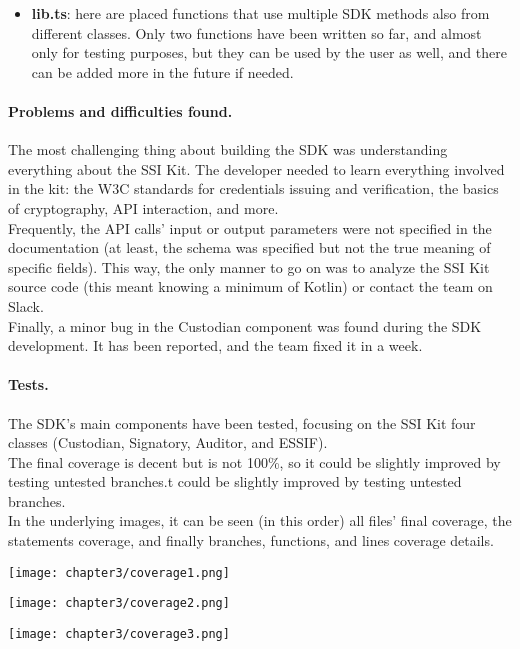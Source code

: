 \begin{itemize}
    \item \textbf{lib.ts}: here are placed functions that use multiple SDK methods also from
    different classes. Only two functions have been written so far, and almost only for
    testing purposes, but they can be used by the user as well, and there can be added more 
    in the future if needed.
    
\end{itemize}

\paragraph{Problems and difficulties found.}
The most challenging thing about building the SDK was understanding everything about 
the SSI Kit. The developer needed to learn everything involved in the kit: the W3C 
standards for credentials issuing and verification, the basics of cryptography,  
API interaction, and more.\\
Frequently, the API calls' input or output parameters were not specified in the 
documentation (at least, the schema was specified but not the true meaning of specific
fields). This way, the only manner to go on was to analyze the SSI Kit source code
 (this meant knowing a minimum of Kotlin) or contact the team on Slack.\\
Finally, a minor bug in the Custodian component was found during the SDK development.
It has been reported, and the team fixed it in a week.

\paragraph{Tests.}
The SDK's main components have been tested, focusing on the SSI Kit four classes 
(Custodian, Signatory, Auditor, and ESSIF).\\
The final coverage is decent but is not 100\%, so it could be slightly improved 
by testing untested branches.t could be slightly improved by testing untested branches.\\
In the underlying images, it can be seen (in this order) all files' final coverage, 
the statements coverage, and finally branches, functions, and lines coverage details.
\vspace{0.5cm}
\begin{center}
    \texttt{[image: chapter3/coverage1.png]}
\end{center}
\begin{center}
    \texttt{[image: chapter3/coverage2.png]}
\end{center}
\begin{center}
    \texttt{[image: chapter3/coverage3.png]}
\end{center}

